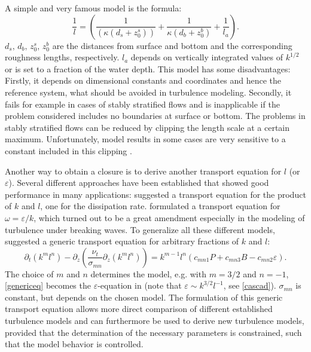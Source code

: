 A simple and very famous model is the \cite{blackadar1962} formula:
\begin{equation}
 \label{blackadar}
 \frac{1}{l} = \left( \frac{1}{(\kappa (d_s + z_0^s) )} + \frac{1}{\kappa (d_b + 
z_0^b)} + \frac{1}{l_a} \right).
\end{equation}
$d_s,\, d_b,\, z_0^s,\, z_0^b$ are the distances from surface and bottom and 
the corresponding roughness lengths, respectively. $l_a$ depends on vertically 
integrated values of $k^{1 \slash 2}$ or is set to a fraction of the water 
depth. This model has some disadvantages: Firstly, it depends on dimensional 
constants and coordinates and hence the reference system, what should be 
avoided in turbulence modeling. Secondly, it fails for example in cases of 
stably stratified flows and is inapplicable if the problem considered includes 
no boundaries at surface or bottom. The problems in stably stratified flows can 
be reduced 
by clipping the length scale at a certain maximum. Unfortunately, model results 
in some cases are very sensitive to a constant included in this clipping 
\citep[][]{UmlaufBurchard2005a}. 

Another way to obtain a closure is to derive another transport equation for $l$ 
(or $\varepsilon$). Several different approaches have been established that 
showed good performance in many applications: \cite{mellor1982} suggested a 
transport equation for the product of $k$ and $l$, \cite{burchard1995} one for 
the dissipation rate. \cite{wilcox1998} formulated a transport equation for 
$\omega = \varepsilon \slash k$, which turned out to be a great amendment 
especially in the modeling of turbulence under breaking waves. To generalize all 
these different models, \cite{UmlaufBurchard2003a} suggested a generic transport 
equation for arbitrary fractions of $k$ and $l$: 
\begin{equation}
 \label{genericeq}
 \partial_t (k^m l^n) - \partial_z \left( \frac{\nu_t}{\sigma_{mn}} 
\partial_z(k^m l^n) \right) = k^{m-1} l^n (c_{mn1}P + c_{mn3} B - c_{mn2} 
\varepsilon ).
\end{equation}
The choice of $m$ and $n$ determines the model, e.g. with $m=3 \slash 2$ and 
$n=-1$, \eqref{genericeq} becomes the $\varepsilon$-equation in 
\cite{burchard1995} (note that $\varepsilon \sim k^{3 \slash 2} l^{-1}$, see 
\eqref{cascad}). $\sigma_{mn}$ is constant, but depends on the chosen model. The 
formulation of this generic transport equation allows more direct comparison of 
different established turbulence models and can furthermore be used to derive 
new turbulence models, provided that the determination of the necessary 
parameters is constrained, such that the model behavior is controlled.

